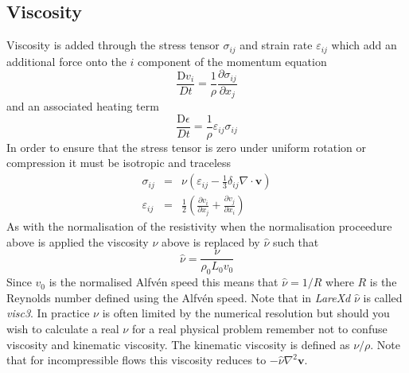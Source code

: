 \documentclass[11pt]{article}
\begin{document}
\subsection{Viscosity}
Viscosity is added through the stress tensor $\sigma_{ij}$ and strain rate $\varepsilon_{ij}$ which add an additional force onto the $i$ component of the momentum equation
\begin{displaymath}
\frac{\mathrm{D}v_i}{Dt}=\frac{1}{\rho}\frac{\partial \sigma_{ij}}{\partial x_j}
\end{displaymath}
and an associated heating term 
\begin{displaymath}
\frac{\mathrm{D}\epsilon}{Dt}=\frac{1}{\rho}\varepsilon_{ij}\sigma_{ij}
\end{displaymath}
In order to ensure that the stress tensor is zero under uniform rotation or compression it must be isotropic and traceless
\begin{eqnarray*}
\sigma_{ij} &=& \nu \left(\varepsilon_{ij}-\frac{1}{3}\delta_{ij}\nabla\cdot\mathbf{v}\right) \\
\varepsilon_{ij} &=& \frac{1}{2}\left(\frac{\partial v_i}{\partial x_j} + \frac{\partial v_j}{\partial x_i} \right)
\end{eqnarray*}
As with the normalisation of the resistivity when the normalisation proceedure above is applied the viscosity $\nu$ above is replaced by $\hat{\nu}$ such that
\begin{displaymath}
 \hat{\nu}=\frac{\nu}{\rho_0 L_0 v_0}
\end{displaymath}
Since $v_0$ is the normalised Alfv\'en speed this means that $\hat{\nu}=1/R$ where $R$ is the Reynolds number defined using the Alfv\'en speed. Note that in {\it LareXd}  $\hat{\nu}$ is called {\it visc3}. In practice $\nu$ is often limited by the numerical resolution but should you wish to calculate a real $\nu$ for a real physical problem remember not to confuse viscosity and kinematic viscosity. The kinematic viscosity is defined as $\nu/\rho$. Note that for incompressible flows this viscosity reduces to $-\hat{\nu} \nabla^2 \mathbf{v}$. 
\end{document}

